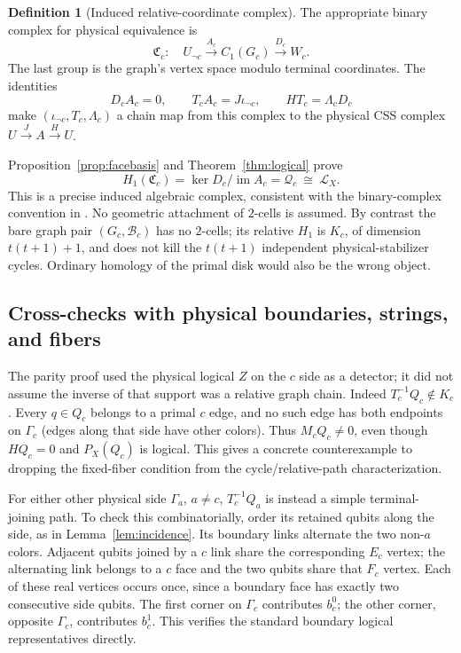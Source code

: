 \documentclass[11pt]{article}
\theoremstyle{definition}
\newtheorem{definition}{Definition}[section]
\theoremstyle{plain}
\theoremstyle{remark}
\begin{document}
\begin{definition}[Induced relative-coordinate complex]\label{def:complex}
The appropriate binary complex for physical equivalence is
\[
 \mathfrak C_c:\quad
 U_{\neg c}\xrightarrow{A_c}C_1(G_c)\xrightarrow{D_c}W_c .
\]
The last group is the graph's vertex space modulo terminal coordinates.
The identities
\[
 D_cA_c=0,\qquad T_cA_c=J\iota_{\neg c},\qquad HT_c=\Lambda_cD_c
\]
make $(\iota_{\neg c},T_c,\Lambda_c)$ a chain map from this complex
to the physical CSS complex $U\xrightarrow J A\xrightarrow H U$.
\end{definition}
Proposition~\ref{prop:facebasis} and Theorem~\ref{thm:logical} prove
\[
 H_1(\mathfrak C_c)=\ker D_c/\operatorname{im}A_c
      =\mathcal Q_c\ \cong\ \mathcal L_X .
\]
This is a precise induced algebraic complex, consistent with the
binary-complex convention in \cite[Definition~3.1]{Delfosse}.
No geometric attachment of $2$-cells is assumed.
By contrast the bare graph pair $(G_c,\mathcal B_c)$ has no $2$-cells;
its relative $H_1$ is $K_c$, of dimension $t(t+1)+1$, and does not
kill the $t(t+1)$ independent physical-stabilizer cycles.
Ordinary homology of the primal disk would also be the wrong object.

\subsection{Cross-checks with physical boundaries, strings, and fibers}
The parity proof used the physical logical $Z$ on the $c$ side as a
detector; it did not assume the inverse of that support was a relative
graph chain. Indeed $T_c^{-1}Q_c\notin K_c$.
Every $q\in Q_c$ belongs to a primal $c$ edge, and no such edge has
both endpoints on $\Gamma_c$ (edges along that side have other colors).
Thus $M_cQ_c\ne0$, even though $HQ_c=0$ and $P_X(Q_c)$ is logical.
This gives a concrete counterexample to dropping the fixed-fiber
condition from the cycle/relative-path characterization.

For either other physical side $\Gamma_a$, $a\ne c$,
$T_c^{-1}Q_a$ is instead a simple terminal-joining path.
To check this combinatorially, order its retained qubits along the
side, as in Lemma~\ref{lem:incidence}.
Its boundary links alternate the two non-$a$ colors.
Adjacent qubits joined by a $c$ link share the corresponding $E_c$
vertex; the alternating link belongs to a $c$ face and the two
qubits share that $F_c$ vertex. Each of these real vertices occurs
once, since a boundary face has exactly two consecutive side qubits.
The first corner on $\Gamma_c$ contributes $b_c^0$; the other corner,
opposite $\Gamma_c$, contributes $b_c^1$.
This verifies the standard boundary logical representatives directly.
\end{document}

